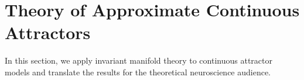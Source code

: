 \documentclass{article} %
\newcommand{\mpcomment}[1]{\textcolor{mpcolor}{(#1)}}
\newcounter{ct}
\theoremstyle{definition}
\theoremstyle{remark}
\begin{document}



\section{Theory of Approximate Continuous Attractors}\label{sec:theory}
In this section, we apply invariant manifold theory to continuous attractor models and translate the results for the theoretical neuroscience audience.
\end{document}
